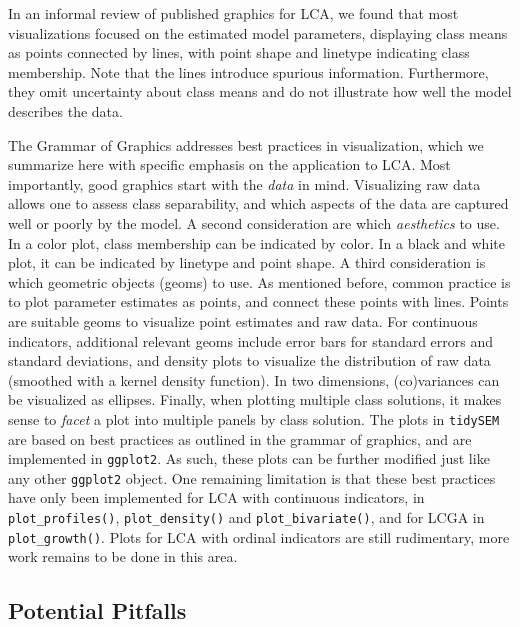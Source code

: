 \documentclass[
  ,man,floatsintext]{apa6}
\begin{document}
In an informal review of published graphics for LCA, we found that most
visualizations focused on the estimated model parameters, displaying
class means as points connected by lines, with point shape and linetype
indicating class membership. Note that the lines introduce spurious
information. Furthermore, they omit uncertainty about class means and do
not illustrate how well the model describes the data.

The Grammar of Graphics addresses best practices in visualization, which
we summarize here with specific emphasis on the application to LCA. Most
importantly, good graphics start with the \emph{data} in mind. Visualizing
raw data allows one to assess class separability, and which aspects of
the data are captured well or poorly by the model. A second
consideration are which \emph{aesthetics} to use. In a color plot, class
membership can be indicated by color. In a black and white plot, it can
be indicated by linetype and point shape. A third consideration is which
geometric objects (geoms) to use. As mentioned before, common practice
is to plot parameter estimates as points, and connect these points with
lines. Points are suitable geoms to visualize point estimates and raw
data. For continuous indicators, additional relevant geoms include error
bars for standard errors and standard deviations, and density plots to
visualize the distribution of raw data (smoothed with a kernel density
function). In two dimensions, (co)variances can be visualized as
ellipses. Finally, when plotting multiple class solutions, it makes
sense to \emph{facet} a plot into multiple panels by class solution. The
plots in \texttt{tidySEM} are based on best practices as outlined in the
grammar of graphics, and are implemented in \texttt{ggplot2}. As such, these
plots can be further modified just like any other \texttt{ggplot2} object. One
remaining limitation is that these best practices have only been
implemented for LCA with continuous indicators, in \texttt{plot\_profiles()},
\texttt{plot\_density()} and \texttt{plot\_bivariate()}, and for LCGA in
\texttt{plot\_growth()}. Plots for LCA with ordinal indicators are still
rudimentary, more work remains to be done in this area.

\hypertarget{potential-pitfalls}{%
\subsection{Potential Pitfalls}\label{potential-pitfalls}}
\end{document}
